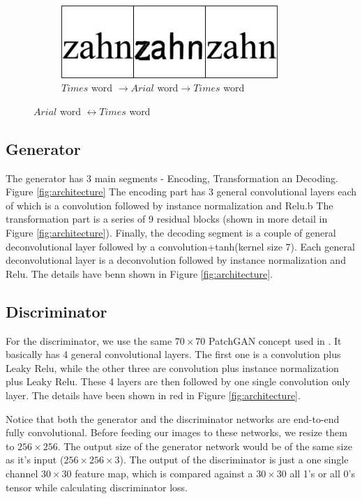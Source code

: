 \documentclass[10pt,twocolumn,letterpaper]{article}
\begin{document}
\begin{figure}[!htb]
\begin{subfigure}[]{0.49\textwidth}
		 \vspace{0.3cm}
		 \includegraphics[width=0.9\textwidth]{test_b_2_a_492}
		 \caption{$Times$ word $\rightarrow Arial$ word$\rightarrow Times$ word}
         \label{fig:times2arial_word}
     \end{subfigure}

     \caption{$Arial$ word $\leftrightarrow Times$ word}
     \label{fig:arial22times_word}
\end{figure} 

\subsection{Generator}
The generator has 3 main segments - Encoding, Transformation an Decoding. Figure 
\ref{fig:architecture} The encoding part has 3 general convolutional
layers each of which is a convolution followed by instance normalization \cite{cyclegan} and Relu.b The transformation part is a series of 9 residual 
blocks (shown in more detail in Figure \ref{fig:architecture}). Finally, the decoding segment is a couple of general deconvolutional layer followed by a convolution+tanh(kernel size 7). Each general deconvolutional layer is a deconvolution followed by instance normalization and Relu. The details have benn shown in Figure \ref{fig:architecture}.

\subsection{Discriminator}
For the discriminator, we use the same $70 \times 70$ PatchGAN concept used in \cite{cyclegan}.
It basically has 4 general convolutional layers. The first one is a convolution plus Leaky Relu, while the other three are convolution plus instance normalization plus Leaky Relu. These 4 layers are then followed by one single 
convolution only layer. The details have been shown in red in Figure \ref{fig:architecture}.

Notice that both the generator and the discriminator networks are end-to-end fully convolutional. Before 
feeding our images to these networks, we resize them to $256 \times 256$. The output size of the generator network would be of the same size as it's input ($256 \times 256 \times 3$). The output of the 
discriminator is just a one single channel $30 \times 30$ feature map, which is compared against a $30 \times 30$ all 1's or all 0's tensor while calculating discriminator loss.
\end{document}
